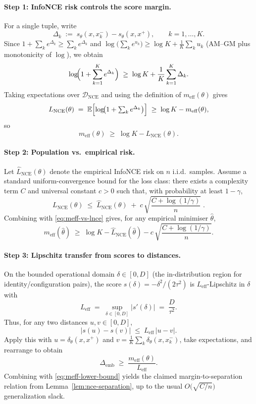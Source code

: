 \documentclass[11pt]{article}
\begin{document}
\paragraph{Step 1: InfoNCE risk controls the score margin.}
For a single tuple, write
\[
\Delta_k
\;:=\;
s_\theta(x,x_k^{-}) - s_\theta(x,x^{+}), \qquad
k=1,\dots,K.
\]
Since $1+\sum_{k}e^{\Delta_k} \ge \sum_{k}e^{\Delta_k}$ and $\log\!\big(\sum_k e^{u_k}\big) \ge
\log K + \frac{1}{K}\sum_k u_k$ (AM–GM plus monotonicity of $\log$), we obtain
\[
\log\!\Bigl(1+\sum_{k=1}^K e^{\Delta_k}\Bigr)
\;\ge\;
\log K + \frac{1}{K}\sum_{k=1}^K \Delta_k.
\]
Taking expectations over $\mathcal{D}_{\mathrm{NCE}}$ and using the definition of
$m_{\mathrm{eff}}(\theta)$ gives
\[
L_{\mathrm{NCE}}(\theta)
\;=\;
\mathbb{E}\Bigl[\log\!\bigl(1+\textstyle\sum_{k} e^{\Delta_k}\bigr)\Bigr]
\;\ge\;
\log K - m_{\mathrm{eff}}(\theta),
\]
so
\begin{equation}
m_{\mathrm{eff}}(\theta) \;\ge\; \log K - L_{\mathrm{NCE}}(\theta).
\label{eq:meff-vs-lnce}
\end{equation}

\paragraph{Step 2: Population vs.~empirical risk.}
Let $\widehat{L}_{\mathrm{NCE}}(\theta)$ denote the empirical InfoNCE risk on $n$ i.i.d.~samples.
Assume a standard uniform-convergence bound for the loss class:
there exists a complexity term $C$ and universal constant $c>0$ such that, with probability at
least $1-\gamma$,
\[
L_{\mathrm{NCE}}(\theta)
\;\le\;
\widehat{L}_{\mathrm{NCE}}(\theta)
\;+\;
c\,\sqrt{\frac{C + \log(1/\gamma)}{n}}\;.
\]
Combining with \eqref{eq:meff-vs-lnce} gives, for any empirical minimiser $\hat\theta$,
\begin{equation}
m_{\mathrm{eff}}(\hat\theta)
\;\ge\;
\log K - \widehat{L}_{\mathrm{NCE}}(\hat\theta)
- c\,\sqrt{\frac{C + \log(1/\gamma)}{n}}.
\label{eq:meff-lower-bound}
\end{equation}

\paragraph{Step 3: Lipschitz transfer from scores to distances.}
On the bounded operational domain $\delta \in [0,D]$ (the in-distribution region for
identity/configuration pairs), the score $s(\delta) = -\delta^2/(2\tau^2)$ is
$L_{\mathrm{eff}}$-Lipschitz in $\delta$ with
\[
L_{\mathrm{eff}}
\;=\;
\sup_{\delta\in[0,D]} |s'(\delta)|
\;=\;
\frac{D}{\tau^2}.
\]
Thus, for any two distances $u,v\in[0,D]$,
\[
|s(u) - s(v)| \;\le\; L_{\mathrm{eff}}\,|u-v|.
\]
Apply this with $u=\delta_\theta(x,x^{+})$ and $v=\frac{1}{K}\sum_k \delta_\theta(x,x_k^{-})$,
take expectations, and rearrange to obtain
\[
\Delta_{\mathrm{emb}}
\;\ge\;
\frac{m_{\mathrm{eff}}(\theta)}{L_{\mathrm{eff}}}.
\]
Combining with \eqref{eq:meff-lower-bound} yields the claimed margin-to-separation relation
from Lemma~\ref{lem:nce-separation}, up to the usual $O\!\big(\sqrt{C/n}\big)$ generalization
slack.
\end{document}
